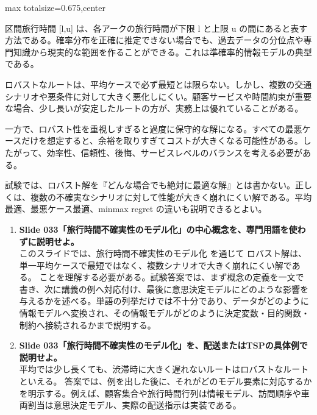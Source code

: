\begin{adjustbox}{max totalsize={\textwidth}{0.675\textheight},center}
\begin{minipage}{\textwidth}
\begin{minipage}[t]{0.485\textwidth}
区間旅行時間 [l,u] は、各アークの旅行時間が下限 l と上限 u の間にあると表す方法である。確率分布を正確に推定できない場合でも、過去データの分位点や専門知識から現実的な範囲を作ることができる。これは準確率的情報モデルの典型である。\par
ロバストなルートは、平均ケースで必ず最短とは限らない。しかし、複数の交通シナリオや悪条件に対して大きく悪化しにくい。顧客サービスや時間約束が重要な場合、少し長いが安定したルートの方が、実務上は優れていることがある。\par
一方で、ロバスト性を重視しすぎると過度に保守的な解になる。すべての最悪ケースだけを想定すると、余裕を取りすぎてコストが大きくなる可能性がある。したがって、効率性、信頼性、後悔、サービスレベルのバランスを考える必要がある。\par
試験では、ロバスト解を『どんな場合でも絶対に最適な解』とは書かない。正しくは、複数の不確実なシナリオに対して性能が大きく崩れにくい解である。平均最適、最悪ケース最適、minmax regret の違いも説明できるとよい。\par
{}
\begin{enumerate}
\item \textbf{Slide 033「旅行時間不確実性のモデル化」の中心概念を、専門用語を使わずに説明せよ。}\\このスライドでは、旅行時間不確実性のモデル化 を通じて ロバスト解は、単一平均ケースで最短ではなく、複数シナリオで大きく崩れにくい解である。 ことを理解する必要がある。試験答案では、まず概念の定義を一文で書き、次に講義の例へ対応付け、最後に意思決定モデルにどのような影響を与えるかを述べる。単語の列挙だけでは不十分であり、データがどのように情報モデルへ変換され、その情報モデルがどのように決定変数・目的関数・制約へ接続されるかまで説明する。
\item \textbf{Slide 033「旅行時間不確実性のモデル化」を、配送またはTSPの具体例で説明せよ。}\\平均では少し長くても、渋滞時に大きく遅れないルートはロバストなルートといえる。 答案では、例を出した後に、それがどのモデル要素に対応するかを明示する。例えば、顧客集合や旅行時間行列は情報モデル、訪問順序や車両割当は意思決定モデル、実際の配送指示は実装である。
\end{enumerate}
\end{minipage}
\end{minipage}
\end{adjustbox}

